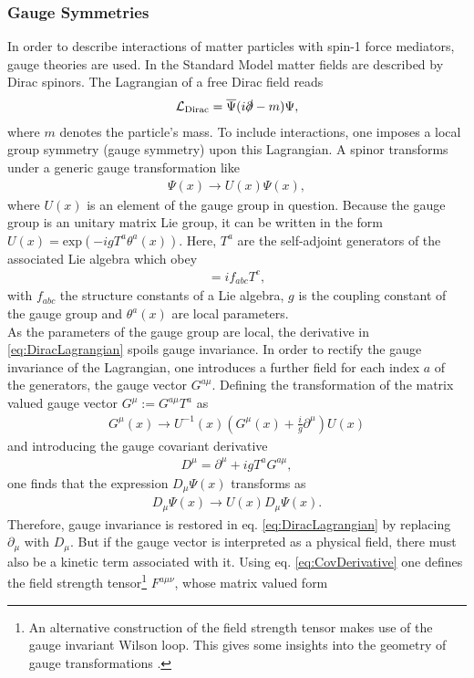 \subsubsection*{Gauge Symmetries} 
In order to describe interactions of matter particles with spin-1 force mediators, gauge theories are used. In the Standard Model matter fields are described by Dirac spinors. The Lagrangian of a free Dirac field reads
\begin{align}
\mathcal{L}_{\mathrm{Dirac}} = \overline{\Psi} ( i\slashed{\partial} - m)\Psi,\label{eq:DiracLagrangian}
\end{align}
where $m$ denotes the particle's mass. To include interactions, one imposes a local group symmetry (gauge symmetry) upon this Lagrangian. A spinor transforms under a generic gauge transformation like 
\begin{align}
\Psi(x) \to U(x)\Psi(x),
\end{align}
where $U(x)$ is an element of the gauge group in question. Because the gauge group is an unitary matrix Lie group, it can be written in the form $U(x)=\mathrm{exp}(-igT^a\theta^a(x))$. Here, $T^a$ are the self-adjoint generators of the associated Lie algebra which obey
\begin{align}
[T^a,T^b] = if_{abc}T^c,
\end{align}
with $f_{abc}$ the structure constants of a Lie algebra, $g$ is the coupling constant of the gauge group and $\theta^a(x)$ are local parameters.\\
As the parameters of the gauge group are local, the derivative in \eqref{eq:DiracLagrangian} spoils gauge invariance. In order to rectify the gauge invariance of the Lagrangian, one introduces a further field for each index $a$ of the generators, the gauge vector $G^{a\mu}$. Defining the transformation of the matrix valued gauge vector $G^\mu := G^{a\mu}T^a$ as 
\begin{align}
G^{\mu}(x) \to U^{-1}(x) \left( G^\mu(x) + \frac{i}{g}\partial^\mu \right) U(x)
\end{align}
and introducing the gauge covariant derivative
\begin{align}
D^\mu = \partial^\mu + igT^aG^{a\mu},
\end{align}
one finds that the expression $D_\mu \Psi(x)$ transforms as
\begin{align}
D_\mu \Psi(x) \to U(x) D_\mu \Psi(x). \label{eq:CovDerivative}
\end{align}
Therefore, gauge invariance is restored in eq. \eqref{eq:DiracLagrangian} by replacing $\partial_\mu$ with $D_\mu$. But if the gauge vector is interpreted as a physical field, there must   also be a kinetic term associated with it. Using eq. \eqref{eq:CovDerivative} one defines the field strength tensor\footnote{An alternative construction of the field strength tensor makes use of the gauge invariant Wilson loop. This gives some insights into the geometry of gauge transformations \cite{Peskin}.} $F^{a\mu\nu}$, whose matrix valued form
